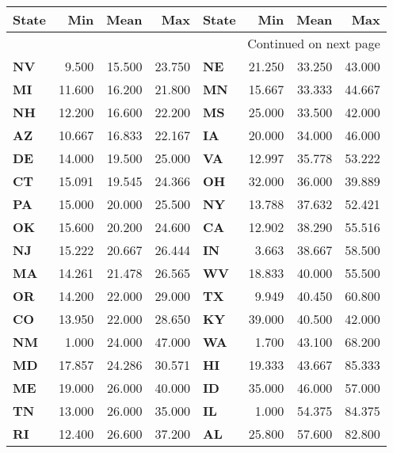 \begin{longtable}{lrrr|lrrr}
\textbf{State} &  \textbf{Min} &  \textbf{Mean} &  \textbf{Max} & \textbf{State} &  \textbf{Min} &  \textbf{Mean} &  \textbf{Max} \\
\midrule
\endhead
\midrule
\multicolumn{8}{r}{{Continued on next page}} \\
\midrule
\endfoot
\endlastfoot
\textbf{NV} &    9.500 &  15.500 &   23.750 & \textbf{NE} &   21.250 &  33.250 &   43.000 \\
\textbf{MI} &   11.600 &  16.200 &   21.800 & \textbf{MN} &   15.667 &  33.333 &   44.667 \\
\textbf{NH} &   12.200 &  16.600 &   22.200 & \textbf{MS} &   25.000 &  33.500 &   42.000 \\
\textbf{AZ} &   10.667 &  16.833 &   22.167 & \textbf{IA} &   20.000 &  34.000 &   46.000 \\
\textbf{DE} &   14.000 &  19.500 &   25.000 & \textbf{VA} &   12.997 &  35.778 &   53.222 \\
\textbf{CT} &   15.091 &  19.545 &   24.366 & \textbf{OH} &   32.000 &  36.000 &   39.889 \\
\textbf{PA} &   15.000 &  20.000 &   25.500 & \textbf{NY} &   13.788 &  37.632 &   52.421 \\
\textbf{OK} &   15.600 &  20.200 &   24.600 & \textbf{CA} &   12.902 &  38.290 &   55.516 \\
\textbf{NJ} &   15.222 &  20.667 &   26.444 & \textbf{IN} &    3.663 &  38.667 &   58.500 \\
\textbf{MA} &   14.261 &  21.478 &   26.565 & \textbf{WV} &   18.833 &  40.000 &   55.500 \\
\textbf{OR} &   14.200 &  22.000 &   29.000 & \textbf{TX} &    9.949 &  40.450 &   60.800 \\
\textbf{CO} &   13.950 &  22.000 &   28.650 & \textbf{KY} &   39.000 &  40.500 &   42.000 \\
\textbf{NM} &    1.000 &  24.000 &   47.000 & \textbf{WA} &    1.700 &  43.100 &   68.200 \\
\textbf{MD} &   17.857 &  24.286 &   30.571 & \textbf{HI} &   19.333 &  43.667 &   85.333 \\
\textbf{ME} &   19.000 &  26.000 &   40.000 & \textbf{ID} &   35.000 &  46.000 &   57.000 \\
\textbf{TN} &   13.000 &  26.000 &   35.000 & \textbf{IL} &    1.000 &  54.375 &   84.375 \\
\textbf{RI} &   12.400 &  26.600 &   37.200 & \textbf{AL} &   25.800 &  57.600 &   82.800 \\

\end{longtable}
